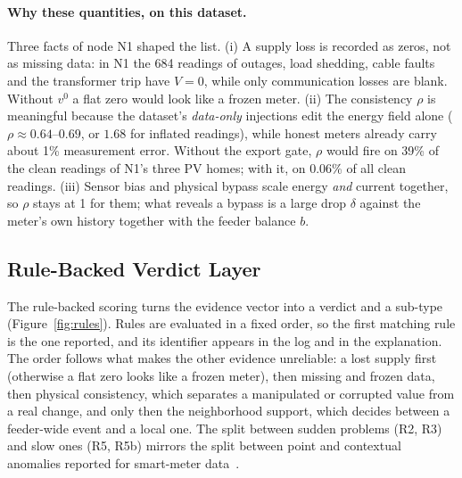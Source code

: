 \documentclass[11pt,a4paper]{article}
\begin{document}
\paragraph{Why these quantities, on this dataset.} Three facts of node N1 shaped the list.
(i) A supply loss is recorded as zeros, not as missing data: in N1 the 684 readings of outages, load
shedding, cable faults and the transformer trip have $V=0$, while only communication losses are blank. Without
$v^{0}$ a flat zero would look like a frozen meter. (ii) The consistency $\rho$ is meaningful because the
dataset's \emph{data-only} injections edit the energy field alone ($\rho\approx0.64$--$0.69$, or $1.68$ for
inflated readings), while honest meters already carry about 1\% measurement error. Without the export gate,
$\rho$ would fire on 39\% of the clean readings of N1's three PV homes; with it, on 0.06\% of all clean
readings. (iii) Sensor bias and physical bypass scale energy \emph{and} current together, so $\rho$ stays at 1
for them; what reveals a bypass is a large drop $\delta$ against the meter's own history together with the
feeder balance $b$.

\subsection{Rule-Backed Verdict Layer}
\label{sec:rules}
The rule-backed scoring turns the evidence vector into a verdict and a sub-type (Figure~\ref{fig:rules}).
Rules are evaluated in a fixed order, so the first matching rule is the one reported, and its identifier
appears in the log and in the explanation. The order follows what makes the other evidence unreliable: a lost
supply first (otherwise a flat zero looks like a frozen meter), then missing and frozen data, then physical
consistency, which separates a manipulated or corrupted value from a real change, and only then the
neighborhood support, which decides between a feeder-wide event and a local one. The split between sudden
problems (R2, R3) and slow ones (R5, R5b) mirrors the split between point and contextual anomalies reported for
smart-meter data~\cite{timefreq}.
\end{document}
